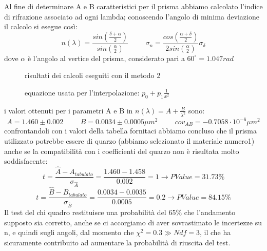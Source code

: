 \documentclass[a4paper]{article}
\theoremstyle{definition}
\begin{document}
Al fine di determinare A e B caratteristici per il prisma abbiamo calcolato l'indice di rifrazione associato ad ogni lambda; conoscendo l'angolo di minima deviazione il calcolo si esegue così:
\[n(\lambda ) = \frac{sin(\frac{\delta + \alpha}{2} )}{sin(\frac{\alpha }{2})} \hspace{1cm} \sigma_{n} = \frac{cos(\frac{\alpha +\delta }{2})}{2sin(\frac{\alpha }{2})}\sigma_{\delta }\]
dove \(\alpha\) è l'angolo al vertice del prisma, considerato pari a \(60^{\circ} = 1.047rad\)
\begin{figure}[!htbp]
    	\captionsetup{labelformat=empty}
    	\caption{risultati dei calcoli eseguiti con il metodo 2}
    \end{figure}
\pagebreak
\begin{figure}[!ht]
    \captionsetup{labelformat=empty}

		\caption{equazione usata per l'interpolazione: $p_{0}+p_{1}\frac{1}{x^{2}}$}
\end{figure}    
 
\noindent i valori ottenuti per i parametri A e B in \(n(\lambda) = A + \frac{B}{\lambda^{2}}\) sono:
\[A=1.460\pm0.002\hspace{1cm} B=0.0034\pm0.0005\mu m^{2} \hspace{1cm} cov_{AB} = -0.7058 \cdot 10^{-6} \mu m ^{2}\]
confrontandoli con i valori della tabella fornitaci abbiamo concluso che il prisma utilizzato potrebbe essere di quarzo (abbiamo selezionato il materiale numero1) anche se la compatibilità con i coefficienti del quarzo non è risultata molto soddisfacente:
\[t = \frac{ \hat{A} - A_{tabulato}}{\sigma_{\hat{A}}} = \frac{1.460 - 1.458}{0.002} = 1 \rightarrow PValue= 31.73\%\]
\[t = \frac{ \hat{B} - B_{tabulato}}{\sigma_{\hat{B}}} = \frac{0.0034 - 0.0035}{0.0005} = 0.2 \rightarrow PValue = 84.15\%\]
Il test del chi quadro restituisce una probabilità del 65\% che l'andamento supposto sia corretto, anche se ci accorgiamo di aver sovrastimato le incertezze su n, e quindi sugli angoli, dal momento che \(\chi^{2} = 0.3 \gg Ndf = 3\), il che ha sicuramente contribuito ad aumentare la probabilità di riuscita del test. \\
 
\end{document}
